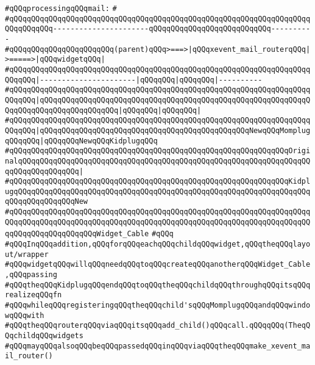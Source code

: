 \verb|#qQQqprocessingqQQqmail:|\newline
\verb|#|\newline
\verb|#qQQqqQQqqQQqqQQqqQQqqQQqqQQqqQQqqQQqqQQqqQQqqQQqqQQqqQQqqQQqqQQqqQQqqQQqqQQqqQQq----------------------qQQqqQQqqQQqqQQqqQQqqQQqqQQq----------|\newline
\verb|#qQQqqQQqqQQqqQQqqQQqqQQq(parent)qQQq>===>|\verb#|qQQqxevent_mail_routerqQQq|>=====>|qQQqwidgetqQQq|#\newline
\verb|#qQQqqQQqqQQqqQQqqQQqqQQqqQQqqQQqqQQqqQQqqQQqqQQqqQQqqQQqqQQqqQQqqQQqqQQqqQQq|\verb#|----------------------|qQQqqQQq|qQQqqQQq|----------#\newline
\verb|#qQQqqQQqqQQqqQQqqQQqqQQqqQQqqQQqqQQqqQQqqQQqqQQqqQQqqQQqqQQqqQQqqQQqqQQqqQQq|\verb#|qQQqqQQqqQQqqQQqqQQqqQQqqQQqqQQqqQQqqQQqqQQqqQQqqQQqqQQqqQQqqQQqqQQqqQQqqQQqqQQqqQQqqQQq|qQQqqQQq|qQQqqQQq|#\newline
\verb|#qQQqqQQqqQQqqQQqqQQqqQQqqQQqqQQqqQQqqQQqqQQqqQQqqQQqqQQqqQQqqQQqqQQqqQQqqQQq|\verb#|qQQqqQQqqQQqqQQqqQQqqQQqqQQqqQQqqQQqqQQqqQQqqQQqNewqQQqMomplugqQQqqQQq|qQQqqQQqNewqQQqKidplugqQQq#\newline
\verb|#qQQqqQQqqQQqqQQqqQQqqQQqqQQqqQQqqQQqqQQqqQQqqQQqqQQqqQQqqQQqqQQqOriginalqQQqqQQqqQQqqQQqqQQqqQQqqQQqqQQqqQQqqQQqqQQqqQQqqQQqqQQqqQQqqQQqqQQqqQQqqQQqqQQqqQQq|\verb#|#\newline
\verb|#qQQqqQQqqQQqqQQqqQQqqQQqqQQqqQQqqQQqqQQqqQQqqQQqqQQqqQQqqQQqqQQqKidplugqQQqqQQqqQQqqQQqqQQqqQQqqQQqqQQqqQQqqQQqqQQqqQQqqQQqqQQqqQQqqQQqqQQqqQQqqQQqqQQqqQQqNew|\newline
\verb|#qQQqqQQqqQQqqQQqqQQqqQQqqQQqqQQqqQQqqQQqqQQqqQQqqQQqqQQqqQQqqQQqqQQqqQQqqQQqqQQqqQQqqQQqqQQqqQQqqQQqqQQqqQQqqQQqqQQqqQQqqQQqqQQqqQQqqQQqqQQqqQQqqQQqqQQqqQQqqQQqWidget_Cable|\newline
\verb|#qQQq|\newline
\verb|#qQQqInqQQqaddition,qQQqforqQQqeachqQQqchildqQQqwidget,qQQqtheqQQqlayout/wrapper|\newline
\verb|#qQQqwidgetqQQqwillqQQqneedqQQqtoqQQqcreateqQQqanotherqQQqWidget_Cable,qQQqpassing|\newline
\verb|#qQQqtheqQQqKidplugqQQqendqQQqtoqQQqtheqQQqchildqQQqthroughqQQqitsqQQqrealizeqQQqfn|\newline
\verb|#qQQqwhileqQQqregisteringqQQqtheqQQqchild'sqQQqMomplugqQQqandqQQqwindowqQQqwith|\newline
\verb|#qQQqtheqQQqrouterqQQqviaqQQqitsqQQqadd_child()qQQqcall.qQQqqQQq(TheqQQqchildqQQqwidgets|\newline
\verb|#qQQqmayqQQqalsoqQQqbeqQQqpassedqQQqinqQQqviaqQQqtheqQQqmake_xevent_mail_router()|\newline
